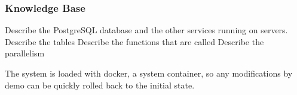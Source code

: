 \subsubsection{Knowledge Base}

Describe the PostgreSQL database and the other services running on servers.
Describe the tables 
Describe the functions that are called
Describe the parallelism

The system is loaded with docker, a system container, so any modifications by demo can be quickly rolled back to the initial state.






